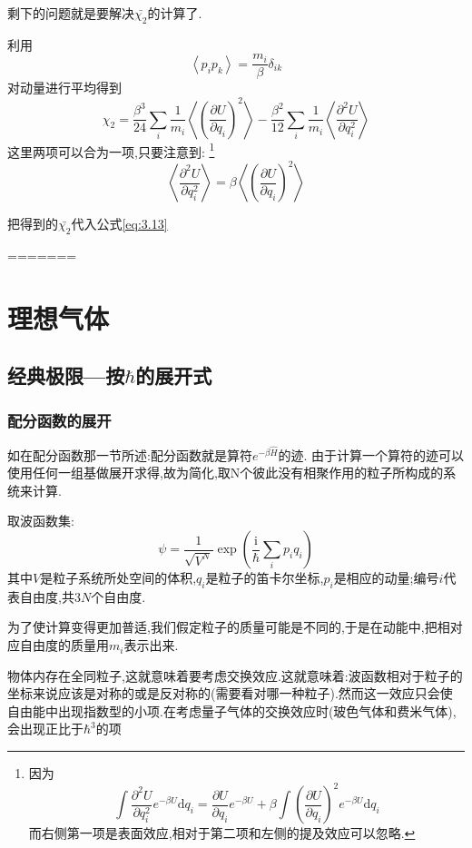 \vspace*{0.5cm}

剩下的问题就是要解决$\bar{\chi_2}$的计算了.

利用 
\[\left< p_i p_k \right> =\dfrac{m_i}{\beta}\delta_{ik}\]
对动量进行平均得到
\begin{equation}
  \chi_2=\dfrac{\beta^{3}}{24}\sum_i \frac{1}{m_i}\left< \left( \dfrac{\partial U}{\partial q_i} \right) ^{2} \right> -\dfrac{\beta^{2}}{12}\sum_i \frac{1}{m_i}\left< \frac{\partial^2 U}{\partial q_i^2} \right> 
\end{equation}
这里两项可以合为一项,只要注意到:
\footnote{因为 
\[\int \frac{\partial^2 U}{\partial q_i^2}e^{-\beta U}\mathrm{d} q_i=\dfrac{\partial U}{\partial q_i}e^{-\beta U}+\beta\int\left( \dfrac{\partial U}{\partial q_i} \right) ^{2}e^{-\beta U}\mathrm{d}  q_i\]
而右侧第一项是表面效应,相对于第二项和左侧的提及效应可以忽略.}
\[\left< \frac{\partial^2 U}{\partial q_i^2} \right> =\beta \left< \left( \dfrac{\partial U}{\partial q_i} \right) ^{2} \right> \]

把得到的$\bar{\chi_2}$代入公式\eqref{eq:3.13}


=======

\section[支线1---理想气体]{理想气体}
\subsection{经典极限---按$\hbar$的展开式}

\subsubsection{配分函数的展开}
如在配分函数那一节所述:配分函数就是算符$e^{-\beta \hat{H}}$的迹. 由于计算一个算符的迹可以使用任何一组基做展开求得,故为简化,取N个彼此没有相聚作用的粒子所构成的系统来计算.

取波函数集:
\[\psi=\frac{1}{\sqrt{V^{N}}}\exp(\frac{\mathrm{i}}{\hbar}\sum_i p_iq_i)\]
其中$V$是粒子系统所处空间的体积,$q_i$是粒子的笛卡尔坐标,$p_i$是相应的动量;编号$i$代表自由度,共$3N$个自由度.

为了使计算变得更加普适,我们假定粒子的质量可能是不同的,于是在动能中,把相对应自由度的质量用$m_i$表示出来.

物体内存在全同粒子,这就意味着要考虑交换效应.这就意味着:波函数相对于粒子的坐标来说应该是对称的或是反对称的(需要看对哪一种粒子).然而这一效应只会使自由能中出现指数型的小项.在考虑量子气体的交换效应时(玻色气体和费米气体),会出现正比于$\hbar^3$的项

